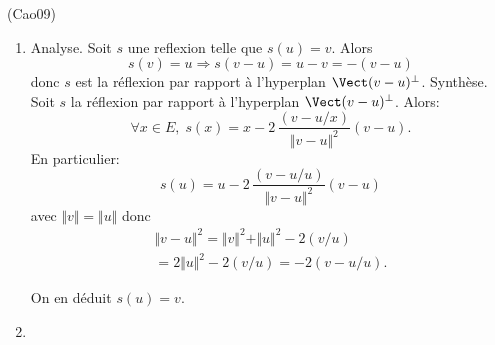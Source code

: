 \begin{tiny}(Cao09)\end{tiny}
\begin{enumerate}
  \item Analyse. Soit $s$ une reflexion telle que $s(u) = v$. Alors
\[
  s(v) = u \Rightarrow s(v-u) = u - v = -(v-u)
\]
donc $s$ est la réflexion par rapport à l'hyperplan $\Vect(v-u)^\bot$.\newline 
Synthèse. Soit $s$ la réflexion par rapport à l'hyperplan $\Vect(v-u)^\bot$. Alors:
\[
  \forall x \in E, \;
  s(x) = x - 2\, \frac{(v-u/x)}{\Vert v-u \Vert^2}(v-u).
\]
En particulier:
\[
  s(u) = u - 2\, \frac{(v-u/u)}{\Vert v-u \Vert^2}(v-u)
\]
avec $\Vert v \Vert = \Vert u \Vert$  donc 
\begin{multline*}
\Vert v-u \Vert^2
  = \Vert v \Vert^2 + \Vert u \Vert^2 - 2 (v / u)\\
  = 2 \Vert u \Vert^2 - 2 (v / u)
  = -2 (v - u / u).
\end{multline*}

On en déduit $s(u) = v$.
  \item 
\end{enumerate}
